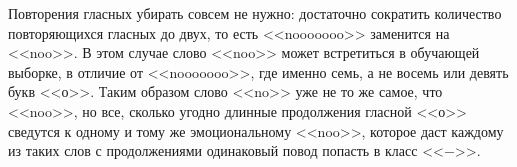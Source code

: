 Повторения гласных убирать совсем не нужно: достаточно сократить количество повторяющихся гласных
до двух, то есть <<nooooooo>> заменится на <<noo>>. В этом случае слово <<noo>> может встретиться в
обучающей выборке, в отличие от <<nooooooo>>, где именно семь, а не восемь или девять букв
<<о>>. Таким образом слово <<no>> уже не то же самое, что <<noo>>, но все, сколько угодно длинные
продолжения гласной <<о>> сведутся к одному и тому же эмоциональному <<noo>>, которое даст каждому
из таких слов с продолжениями одинаковый повод попасть в класс <<$\minus$>>.
